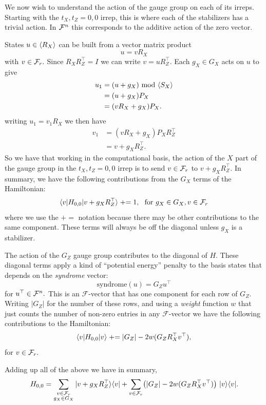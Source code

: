 \documentclass[12pt]{article}
\newcommand{\Field}{\mathcal{F}}
\begin{document}
We now wish to understand the action of the
gauge group on each of its irreps.
Starting with the $t_X,t_Z=0,0$ irrep,
this is where each of the stabilizers has
a trivial action. 
In $\Fn$ this
corresponds to the additive action of the zero vector.

\newcommand{\pluseq}{\mathrel{+}=}
States $u\in\langle R_X \rangle$ can be built from a
vector matrix product
$$
    u = v R_X
$$
with $v\in\Frd.$
Since $R_X R_Z^\top = I$
we can write $v = u R_Z^\top.$
Each $g_X\in G_X$ acts on $u$ to give
\begin{align*}
    u_1 &= (u + g_X) \ \mbox{mod}\ \langle S_X \rangle \\
        &= (u + g_X) P_X \\
        &= (v R_X + g_X) P_X.
\end{align*}
writing $u_1 = v_1 R_X$ we then have
\begin{align*}
    v_1 &= (v R_X + g_X) P_X R_Z^\top \\
        &= v + g_X R_Z^\top.
\end{align*}
So we have that working in the computational
basis, the action of the $X$ part of the
gauge group in the $t_X,t_Z=0,0$ irrep is to send
$v\in \Frd$ to $v + g_X R_Z^\top.$
In summary, we have the following contributions from the
$G_X$ terms of the Hamiltonian:
$$
    \bra{v} H_{0,0} \ket{v+g_X  R_Z^\top} 
        \pluseq 1,\ \ \mbox{for}\ g_X\in G_X, v\in \Frd
$$
where we use the $\pluseq$ notation
because there may be other contributions to the
same component.
These terms will always be off
the diagonal unless $g_X$ is a stabilizer.

The action of the $G_Z$ gauge group
contributes to the diagonal of $H.$
These diagonal terms apply a kind of
``potential energy'' penalty
to the basis states
that depends on the \emph{syndrome} vector:
$$
    \mbox{syndrome}(u) = G_Z u^\top
$$
for $u^\top \in \Fn.$
This is an $\Field$-vector that has one component for
each row of $G_Z.$
Writing $|G_Z|$ for the number of these rows, and 
using a \emph{weight} function $w$ that just counts
the number of non-zero entries in any $\Field$-vector
we have the following contributions to
the Hamiltonian:
$$
    \bra{v} H_{0,0} \ket{v} 
        \pluseq |G_Z| - 2w(G_Z R_X^\top v^\top),
$$
for $v\in \Frd.$

Adding up all of the above we
have in summary,
$$
H_{0,0} = \sum_{\substack{v\in\Frd\\g_X\in G_X } }
  \ket{v+g_X  R_Z^\top}\bra{v} 
  + \sum_{v\in\Frd} \bigl(|G_Z| - 2w(G_Z R_X^\top v^\top)
    \bigr) \ \ket{v}\bra{v}.
$$
\end{document}
